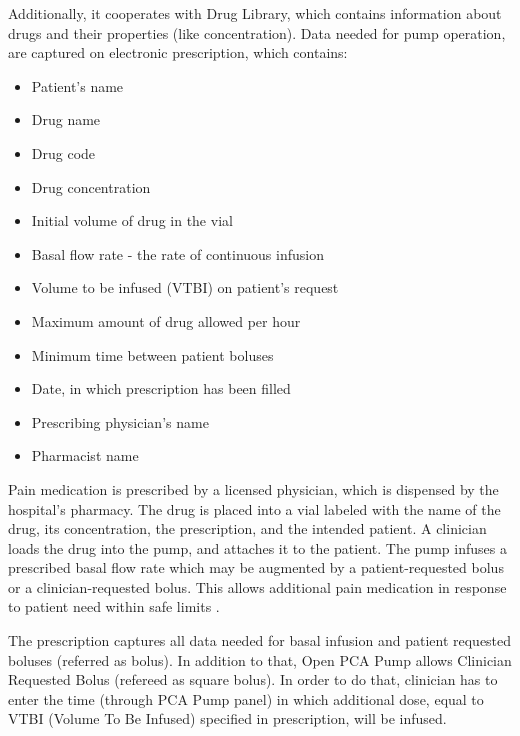 Additionally, it cooperates with Drug Library, which contains information about drugs and their properties (like concentration). Data needed for pump operation, are captured on electronic prescription, which contains:
\begin{itemize} \itemsep1pt \parskip0pt 
    \item Patient's name
    \item Drug name
    \item Drug code
    \item Drug concentration
    \item Initial volume of drug in the vial
    \item Basal flow rate - the rate of continuous infusion
    \item Volume to be infused (VTBI) on patient's request
    \item Maximum amount of drug allowed per hour
    \item Minimum time between patient boluses
    \item Date, in which prescription has been filled
    \item Prescribing physician's name
    \item Pharmacist name
\end{itemize}

Pain medication is prescribed by a licensed physician, which is dispensed by the hospital's pharmacy. The drug is placed into a vial labeled with the name of the drug, its concentration, the prescription, and the intended patient. A clinician loads the drug into the pump, and attaches it to the patient. The pump infuses a prescribed basal flow rate which may be augmented by a patient-requested bolus or a clinician-requested bolus. This allows additional pain medication in response to patient need within safe limits \cite{PcaReq}.

The prescription captures all data needed for basal infusion and patient requested boluses (referred as bolus). In addition to that, Open PCA Pump allows Clinician Requested Bolus (refereed as square bolus). In order to do that, clinician has to enter the time (through PCA Pump panel) in which additional dose, equal to VTBI (Volume To Be Infused) specified in prescription, will be infused.

